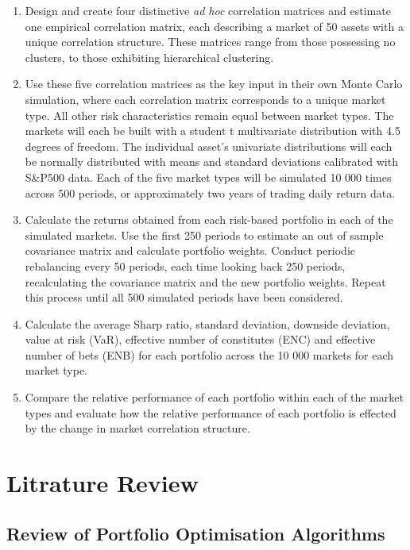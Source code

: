 \documentclass[11pt,preprint, authoryear]{elsarticle}
\numberwithin{equation}{section}
\numberwithin{figure}{section}
\numberwithin{table}{section}
\begin{document}
\begin{enumerate}
\def\labelenumi{\arabic{enumi}.}
\item
  Design and create four distinctive \emph{ad hoc} correlation matrices
  and estimate one empirical correlation matrix, each describing a
  market of 50 assets with a unique correlation structure. These
  matrices range from those possessing no clusters, to those exhibiting
  hierarchical clustering.
\item
  Use these five correlation matrices as the key input in their own
  Monte Carlo simulation, where each correlation matrix corresponds to a
  unique market type. All other risk characteristics remain equal
  between market types. The markets will each be built with a student t
  multivariate distribution with 4.5 degrees of freedom. The individual
  asset's univariate distributions will each be normally distributed
  with means and standard deviations calibrated with S\&P500 data. Each
  of the five market types will be simulated 10 000 times across 500
  periods, or approximately two years of trading daily return data.
\item
  Calculate the returns obtained from each risk-based portfolio in each
  of the simulated markets. Use the first 250 periods to estimate an out
  of sample covariance matrix and calculate portfolio weights. Conduct
  periodic rebalancing every 50 periods, each time looking back 250
  periods, recalculating the covariance matrix and the new portfolio
  weights. Repeat this process until all 500 simulated periods have been
  considered.
\item
  Calculate the average Sharp ratio, standard deviation, downside
  deviation, value at risk (VaR), effective number of constitutes (ENC)
  and effective number of bets (ENB) for each portfolio across the 10
  000 markets for each market type.
\item
  Compare the relative performance of each portfolio within each of the
  market types and evaluate how the relative performance of each
  portfolio is effected by the change in market correlation structure.
\end{enumerate}

\hypertarget{litrature-review}{%
\section{\texorpdfstring{Litrature Review
\label{lit}}{Litrature Review }}\label{litrature-review}}

\hypertarget{review-of-portfolio-optimisation-algorithms}{%
\subsection{Review of Portfolio Optimisation
Algorithms}\label{review-of-portfolio-optimisation-algorithms}}
\end{document}
